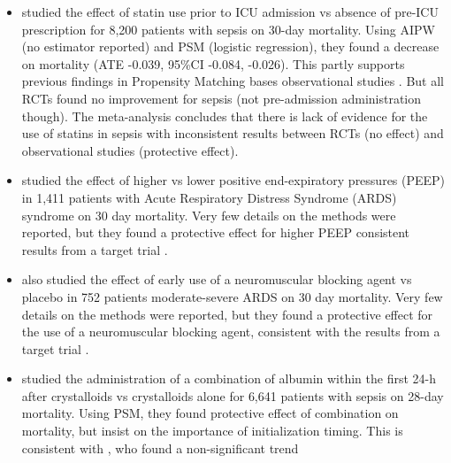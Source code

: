 \documentclass[10pt,letterpaper]{article}
\begin{document}
\begin{itemize}[leftmargin=2ex]
  \item \cite{chinaeke2021impact} studied the effect of \textcolor{I}{statin use
          prior to ICU admission} vs \textcolor{C}{absence of pre-ICU
          prescription} for \textcolor{P}{8,200 patients with sepsis} on
        \textcolor{O}{30-day mortality}. Using AIPW (no estimator reported)
        and PSM (logistic regression), they found a decrease on mortality (ATE
        -0.039, 95\%CI -0.084, -0.026). This partly supports previous
        findings in Propensity Matching bases observational studies
        \cite{lee2017preadmission,kyu2019preadmission}. But all RCTs
        \cite{national2014rosuvastatin,singh2017effects} found no improvement for sepsis (not
        pre-admission administration though). The \cite{wan2014effect}
        meta-analysis concludes that there is lack of evidence for the use of
        statins in sepsis with inconsistent results between RCTs (no effect)
        and observational studies (protective effect).
  \item \cite{adibuzzaman2019323} studied the effect of \textcolor{I}{higher} vs
        \textcolor{C}{lower positive end-expiratory pressures (PEEP)} in
        \textcolor{P}{1,411 patients with Acute Respiratory Distress Syndrome
          (ARDS) syndrome} on \textcolor{O}{30 day mortality}. Very few details on
        the methods were reported, but they found a protective effect for higher PEEP
        consistent results from a target trial \cite{national2004higher}.
  \item \cite{adibuzzaman2019323} also studied the effect of \textcolor{I}{early
          use of a neuromuscular blocking agent } vs \textcolor{C}{placebo} in
        \textcolor{P}{752 patients moderate-severe ARDS} on \textcolor{O}{30
          day mortality}. Very few details on the methods were reported, but they found a
        protective effect for the use of a neuromuscular blocking agent,
        consistent with the results from a target trial
        \cite{papazian2010neuromuscular}.
  \item \cite{zhou2021early} studied the administration of \textcolor{I}{a
          combination of albumin within the first 24-h after crystalloids} vs
        \textcolor{C}{crystalloids alone} for \textcolor{P}{6,641 patients
          with sepsis} on \textcolor{O}{28-day mortality}. Using PSM, they found
        protective effect of combination on mortality, but insist on the
        importance of initialization timing. This is consistent with \cite{xu2014comparison}, who
        found a non-significant trend

\end{itemize}
\end{document}
